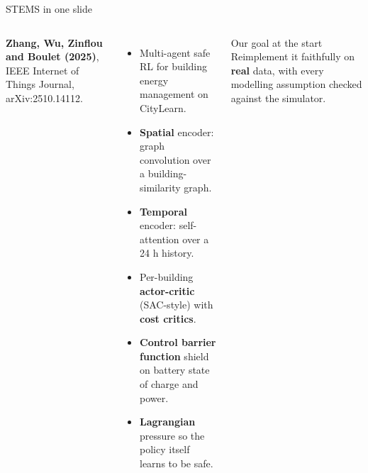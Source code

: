 \documentclass[aspectratio=169,10pt]{beamer}
\begin{document}
\begin{frame}{STEMS in one slide}
\begin{columns}[T]
\textbf{Zhang, Wu, Zinflou and Boulet (2025)}, IEEE Internet of Things Journal, arXiv:2510.14112.
\begin{itemize}
  \item Multi-agent safe RL for building energy management on CityLearn.
  \item \textbf{Spatial} encoder: graph convolution over a building-similarity graph.
  \item \textbf{Temporal} encoder: self-attention over a 24 h history.
  \item Per-building \textbf{actor-critic} (SAC-style) with \textbf{cost critics}.
  \item \textbf{Control barrier function} shield on battery state of charge and power.
  \item \textbf{Lagrangian} pressure so the policy itself learns to be safe.
\end{itemize}
\begin{block}{Our goal at the start}
Reimplement it faithfully on \textbf{real} data, with every modelling assumption checked against the simulator.
\end{block}
\end{columns}
\end{frame}
\end{document}
